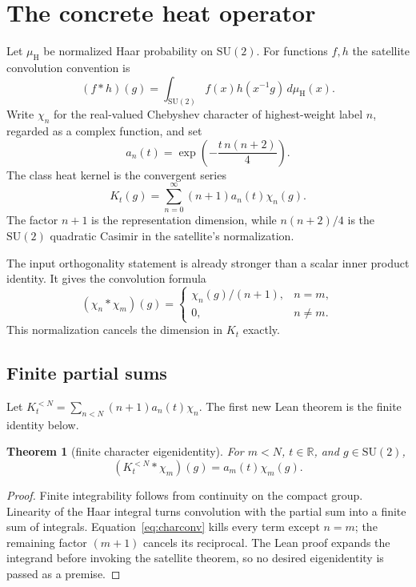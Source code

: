 \documentclass[11pt]{article}
\newtheorem{theorem}{Theorem}[section]
\theoremstyle{definition}
\theoremstyle{remark}
\newcommand{\SU}{\mathrm{SU}(2)}
\newcommand{\Haar}{\mu_{\mathrm H}}
\begin{document}
\section{The concrete heat operator}

Let $\Haar$ be normalized Haar probability on $\SU$.  For functions $f,h$ the
satellite convolution convention is
\[
  (f*h)(g)=\int_{\SU} f(x)h(x^{-1}g)\,d\Haar(x).
\]
Write $\chi_n$ for the real-valued Chebyshev character of highest-weight label
$n$, regarded as a complex function, and set
\[
  a_n(t)=\exp\!\left(-\frac{t\,n(n+2)}4\right).
\]
The class heat kernel is the convergent series
\[
  K_t(g)=\sum_{n=0}^{\infty}(n+1)a_n(t)\chi_n(g).
\]
The factor $n+1$ is the representation dimension, while $n(n+2)/4$ is the
$\SU$ quadratic Casimir in the satellite's normalization.

The input orthogonality statement is already stronger than a scalar inner
product identity.  It gives the convolution formula
\begin{equation}\label{eq:charconv}
  (\chi_n*\chi_m)(g)=
  \begin{cases}
    \chi_n(g)/(n+1),&n=m,\\
    0,&n\ne m.
  \end{cases}
\end{equation}
This normalization cancels the dimension in $K_t$ exactly.

\subsection{Finite partial sums}

Let $K_t^{<N}=\sum_{n<N}(n+1)a_n(t)\chi_n$.  The first new Lean theorem is the
finite identity below.

\begin{theorem}[finite character eigenidentity]\label{thm:finite}
For $m<N$, $t\in\mathbb R$, and $g\in\SU$,
\[
  (K_t^{<N}*\chi_m)(g)=a_m(t)\chi_m(g).
\]
\end{theorem}

\begin{proof}
Finite integrability follows from continuity on the compact group.  Linearity
of the Haar integral turns convolution with the partial sum into a finite sum
of integrals.  Equation~\eqref{eq:charconv} kills every term except $n=m$;
the remaining factor $(m+1)$ cancels its reciprocal.  The Lean proof expands
the integrand before invoking the satellite theorem, so no desired
eigenidentity is passed as a premise.
\end{proof}
\end{document}
